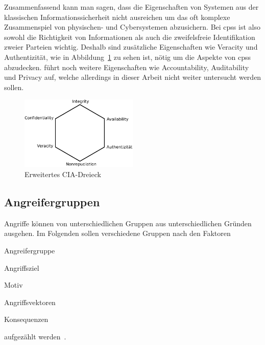\documentclass[final,bibliography=totocnumbered]{include/sikseminar}
\newcommand{\cps}{\glspl{cps}\xspace}
\begin{document}
Zusammenfassend kann man sagen, dass die Eigenschaften von Systemen aus der klassischen Informationssicherheit nicht ausreichen um das oft komplexe Zusammenspiel von physischen- und Cybersystemen abzusichern.
Bei \cps ist also sowohl die Richtigkeit von Informationen als auch die zweifelsfreie Identifikation zweier Parteien wichtig.
Deshalb sind zusätzliche Eigenschaften wie Veracity und Authentizität, wie in Abbildung~\ref{fig:triad} zu sehen ist, nötig um die Aspekte von \cps abzudecken.
\citeauthor{CH13} führt noch weitere Eigenschaften wie Accountability, Auditability und Privacy auf, welche allerdings in dieser Arbeit nicht weiter untersucht werden sollen.

\begin{figure}
    \centering
    \includegraphics[width=0.5\textwidth]{triad}
    \caption{Erweitertes CIA-Dreieck}
    \label{fig:triad}
\end{figure}



\subsection{Angreifergruppen}\label{subsec:angreifergruppen}

Angriffe können von unterschiedlichen Gruppen aus unterschiedlichen Gründen ausgehen.
Im Folgenden sollen verschiedene Gruppen nach den Faktoren
\begin{enumerate*}[label=(\alph*),before=\unskip{: }, itemjoin={{; }}, itemjoin*={{, und }}]
    \item Angreifergruppe\label{factor:angreifergruppe}
    \item Angriffsziel\label{factor:target}
    \item Motiv\label{factor:motiv}
    \item Angriffsvektoren\label{factor:methode}
    \item Konsequenzen\label{factor:konsequenz}
\end{enumerate*} aufgezählt werden~\cite{HLL+17}.
\end{document}
